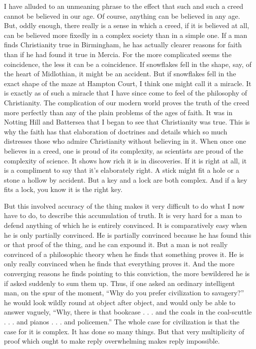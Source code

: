 I have alluded to an unmeaning phrase to the effect that such and such a creed cannot be believed in our age. Of course, anything can be believed in any age. But, oddly enough, there really is a sense in which a creed, if it is believed at all, can be believed more fixedly in a complex society than in a simple one. If a man finds Christianity true in Birmingham, he has actually clearer reasons for faith than if he had found it true in Mercia. For the more complicated seems the coincidence, the less it can be a coincidence. If snowflakes fell in the shape, say, of the heart of Midlothian, it might be an accident. But if snowflakes fell in the exact shape of the maze at Hampton Court, I think one might call it a miracle. It is exactly as of such a miracle that I have since come to feel of the philosophy of Christianity. The complication of our modern world proves the truth of the creed more perfectly than any of the plain problems of the ages of faith. It was in Notting Hill and Battersea that I began to see that Christianity was true. This is why the faith has that elaboration of doctrines and details which so much distresses those who admire Christianity without believing in it. When once one believes in a creed, one is proud of its complexity, as scientists are proud of the complexity of science. It shows how rich it is in discoveries. If it is right at all, it is a compliment to say that it’s elaborately right. A stick might fit a hole or a stone a hollow by accident. But a key and a lock are both complex. And if a key fits a lock, you know it is the right key.

But this involved accuracy of the thing makes it very difficult to do what I now have to do, to describe this accumulation of truth. It is very hard for a man to defend anything of which he is entirely convinced. It is comparatively easy when he is only partially convinced. He is partially convinced because he has found this or that proof of the thing, and he can expound it. But a man is not really convinced of a philosophic theory when he finds that something proves it. He is only really convinced when he finds that everything proves it. And the more converging reasons he finds pointing to this conviction, the more bewildered he is if asked suddenly to sum them up. Thus, if one asked an ordinary intelligent man, on the spur of the moment, “Why do you prefer civilization to savagery?” he would look wildly round at object after object, and would only be able to answer vaguely, “Why, there is that bookcase . . . and the coals in the coal-scuttle . . . and pianos . . . and policemen.” The whole case for civilization is that the case for it is complex. It has done so many things. But that very multiplicity of proof which ought to make reply overwhelming makes reply impossible.


